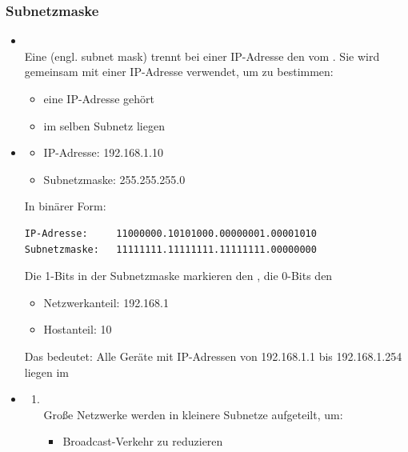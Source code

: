 \subsubsection*{Subnetzmaske}
\begin{itemize}
    \item {}\\
    Eine  (engl. subnet mask) trennt bei einer IP-Adresse den  vom . Sie wird gemeinsam mit einer IP-Adresse verwendet, um zu bestimmen:
    \begin{itemize}
        \item {} eine IP-Adresse gehört
        \item {} im selben Subnetz liegen
    \end{itemize}
    \item {}
    \begin{itemize}
        \item IP-Adresse: 192.168.1.10
        \item Subnetzmaske: 255.255.255.0
    \end{itemize}
    In binärer Form:
\begin{lstlisting}
IP-Adresse:     11000000.10101000.00000001.00001010
Subnetzmaske:   11111111.11111111.11111111.00000000
\end{lstlisting}   
    Die 1-Bits in der Subnetzmaske markieren den , die 0-Bits den \\
    \begin{itemize}
        \item Netzwerkanteil: 192.168.1
        \item Hostanteil: 10
    \end{itemize}
    Das bedeutet: Alle Geräte mit IP-Adressen von 192.168.1.1 bis 192.168.1.254 liegen im 
    \item {}
    \begin{enumerate}
        \item {}\\
        Große Netzwerke werden in kleinere Subnetze aufgeteilt, um:
        \begin{itemize}
            \item Broadcast-Verkehr zu reduzieren

\end{itemize}
\end{enumerate}
\end{itemize}
